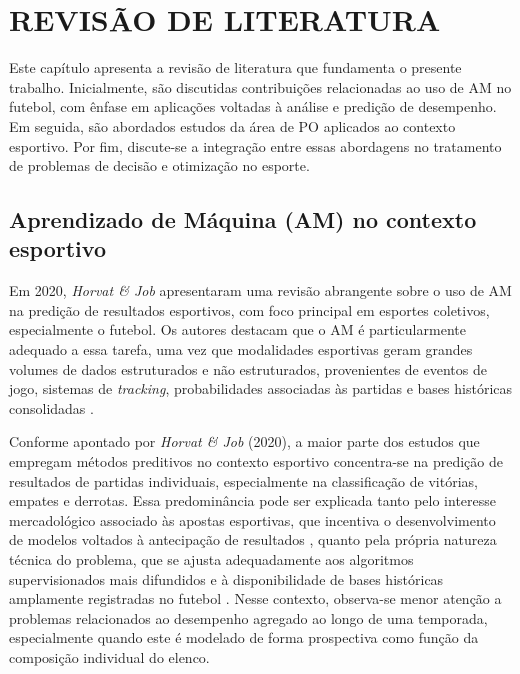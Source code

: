 \chapter{REVISÃO DE LITERATURA}

Este capítulo apresenta a revisão de literatura que fundamenta o presente trabalho. Inicialmente, são discutidas contribuições relacionadas 
ao uso de AM no futebol, com ênfase em aplicações voltadas à análise e predição de desempenho. Em seguida, são abordados estudos 
da área de PO aplicados ao contexto esportivo. Por fim, discute-se a integração entre essas abordagens no tratamento de problemas de decisão e otimização no esporte.

\section{Aprendizado de Máquina (AM) no contexto esportivo}

Em 2020, \textit{Horvat \& Job} apresentaram uma revisão abrangente sobre o uso de AM na predição de resultados esportivos, 
com foco principal em esportes coletivos, especialmente o futebol. Os autores destacam que o AM é particularmente adequado a essa tarefa, 
uma vez que modalidades esportivas geram grandes volumes de dados estruturados e não estruturados, provenientes de eventos de jogo, sistemas de \textit{tracking}, 
probabilidades associadas às partidas e bases históricas consolidadas \cite{Horvat2020}.

Conforme apontado por \textit{Horvat \& Job} (2020), a maior parte dos estudos que empregam métodos preditivos no contexto esportivo concentra-se na predição 
de resultados de partidas individuais, especialmente na classificação de vitórias, empates e derrotas. Essa predominância pode ser explicada tanto pelo 
interesse mercadológico associado às apostas esportivas, que incentiva o desenvolvimento de modelos voltados à antecipação de resultados \cite{Abidin2021}, 
quanto pela própria natureza técnica do problema, que se ajusta adequadamente aos algoritmos supervisionados mais difundidos e à disponibilidade de bases 
históricas amplamente registradas no futebol \cite{Horvat2020}. Nesse contexto, observa-se menor atenção a problemas relacionados ao desempenho agregado ao 
longo de uma temporada, especialmente quando este é modelado de forma prospectiva como função da composição individual do elenco.

